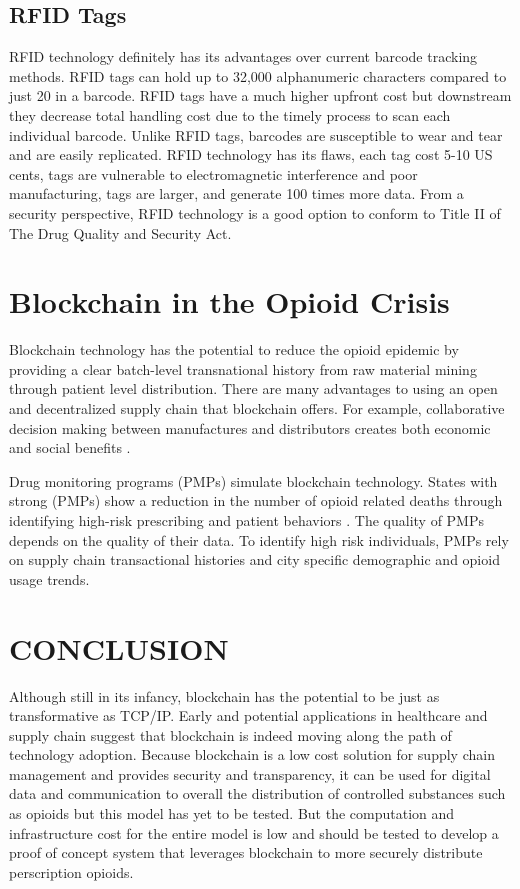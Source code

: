 \documentclass[sigconf]{acmart}
\begin{document}
\subsection{RFID Tags}
RFID technology definitely has its advantages over current barcode tracking methods. RFID tags can hold up to 32,000 alphanumeric characters compared to just 20 in a barcode. RFID tags have a much higher upfront cost but downstream they decrease total handling cost due to the timely process to scan each individual barcode. Unlike RFID tags, barcodes are susceptible to wear and tear and are easily replicated. RFID technology has its flaws, each tag cost 5-10 US cents, tags are vulnerable to electromagnetic interference and poor manufacturing, tags are larger, and generate 100 times more data\cite{Taylor01}\cite{opsis9}. From a security perspective, RFID technology is a good option to conform to Title II of The Drug Quality and Security Act.

\section{Blockchain in the Opioid Crisis}
Blockchain technology has the potential to reduce the opioid epidemic by providing a clear batch-level transnational history from raw material mining through patient level distribution. There are many advantages to using an open and decentralized supply chain that blockchain offers. For example, collaborative decision making between manufactures and distributors creates both economic and social benefits \cite{Nematollahi01}. 

Drug monitoring programs (PMPs) simulate blockchain technology. States with strong (PMPs) show a reduction in the number of opioid related deaths through identifying high-risk prescribing and patient behaviors \cite{pardo01}\cite{patrick01}. The quality of PMPs depends on the quality of their data. To identify high risk individuals, PMPs rely on supply chain transactional histories and city specific demographic and opioid usage trends. 

\section{CONCLUSION}
Although still in its infancy, blockchain has the potential to be just as transformative as TCP/IP. Early and potential applications in healthcare and supply chain suggest that blockchain is indeed moving along the path of technology adoption. Because blockchain is a low cost solution for supply chain management and provides security and transparency, it can be used for digital data and communication to overall the distribution of controlled substances such as opioids but this model has yet to be tested. But the computation and infrastructure cost for the entire model is low and should be tested to develop a proof of concept system that leverages blockchain to more securely distribute perscription opioids.
\end{document}
